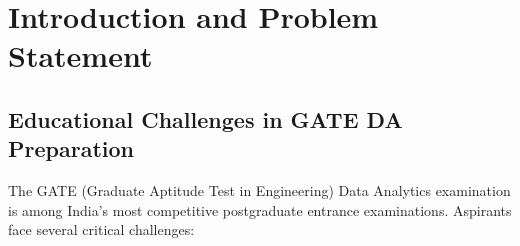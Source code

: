 \documentclass[sigconf,authordraft,twoside]{acmart}
\title[\project{}]{\reporttitle}
\subtitle{\reportsubtitle}
\author{\reportauthorname}
\affiliation{%
  \institution{B.Tech Project Report}
}
\newcommand{\project}{GATEWay}
\begin{document}
\begin{abstract}
\project{} is a sophisticated, classroom-aware educational intelligence platform designed specifically for GATE (Graduate Aptitude Test in Engineering) Data Analytics (DA) preparation. The system provides dual-mode experiences: a comprehensive student workspace for structured practice, adaptive testing, personalized coaching, and performance tracking, coupled with an advanced teacher command center for classroom orchestration, assignment management, learner monitoring, and intervention planning. 

The platform's core innovation lies in its unified architecture that seamlessly integrates multiple specialized recommendation engines, a telemetry-driven analytics layer powered by Supabase, graph-based adaptive sequencing, intelligent rule-based coaching, comprehensive performance analytics, and a novel predictive scoring model. This report provides a detailed technical exposition of the complete system architecture, mathematical formulas underlying key recommendations, all data models, recommendation engine implementations, teacher analytics pipelines, and the comprehensive GATE score prediction formula with detailed variable explanations. The document spans multiple dimensions: product vision, system design, algorithmic foundations, implementation details, and research assets, making it suitable for technical portfolios, advanced project vivas, research presentations, and academic evaluation.
\end{abstract}


\maketitle


\section{Introduction and Problem Statement}

\subsection{Educational Challenges in GATE DA Preparation}
The GATE (Graduate Aptitude Test in Engineering) Data Analytics examination is among India's most competitive postgraduate entrance examinations. Aspirants face several critical challenges:
\end{document}
